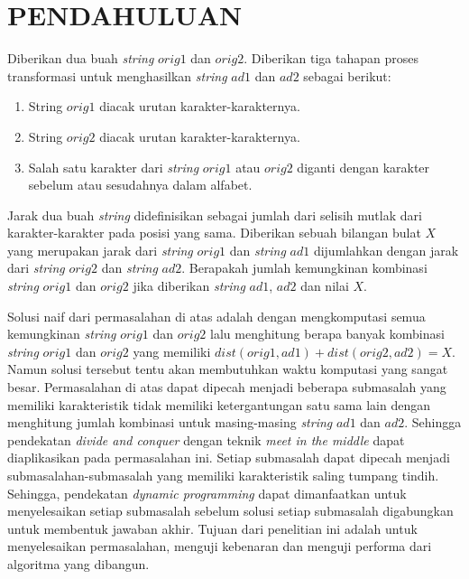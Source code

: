 \documentclass[a4paper]{IEEEtran}
\begin{document}
\section{PENDAHULUAN}

Diberikan dua buah \textit{string} $orig1$ dan $orig2$. Diberikan tiga tahapan proses transformasi untuk menghasilkan \textit{string} $ad1$ dan $ad2$ sebagai berikut:

\begin{enumerate}
	\item String $orig1$ diacak urutan karakter-karakternya.
	\item String $orig2$ diacak urutan karakter-karakternya.
	\item Salah satu karakter dari \textit{string} $orig1$ atau $orig2$ diganti dengan karakter sebelum atau sesudahnya dalam alfabet.
\end{enumerate}	

Jarak dua buah \textit{string} didefinisikan sebagai jumlah dari selisih mutlak dari karakter-karakter pada posisi yang sama. Diberikan sebuah bilangan bulat $X$ yang merupakan jarak dari \textit{string} $orig1$ dan \textit{string} $ad1$ dijumlahkan dengan jarak dari \textit{string} $orig2$ dan \textit{string} $ad2$. Berapakah jumlah kemungkinan kombinasi \textit{string} $orig1$ dan $orig2$ jika diberikan \textit{string} $ad1$, $ad2$ dan nilai $X$.

Solusi naif dari permasalahan di atas adalah dengan mengkomputasi semua kemungkinan \textit{string} $ orig1 $ dan $ orig2 $ lalu menghitung berapa banyak kombinasi \textit{string} $ orig1 $ dan $ orig2 $ yang memiliki $ dist(orig1, ad1) + dist(orig2, ad2) = X $. Namun solusi tersebut tentu akan membutuhkan waktu komputasi yang sangat besar. Permasalahan di atas dapat dipecah menjadi beberapa submasalah yang memiliki karakteristik tidak memiliki ketergantungan satu sama lain dengan menghitung jumlah kombinasi untuk masing-masing \textit{string} $ ad1 $ dan $ ad2 $. Sehingga pendekatan \textit{divide and conquer} dengan teknik \textit{meet in the middle} dapat diaplikasikan pada permasalahan ini. Setiap submasalah dapat dipecah menjadi submasalahan-submasalah yang memiliki karakteristik saling tumpang tindih. Sehingga, pendekatan \textit{dynamic programming} dapat dimanfaatkan untuk menyelesaikan setiap submasalah sebelum solusi setiap submasalah digabungkan untuk membentuk jawaban akhir. Tujuan dari penelitian ini adalah untuk menyelesaikan permasalahan, menguji kebenaran dan menguji performa dari algoritma yang dibangun.
\end{document}
